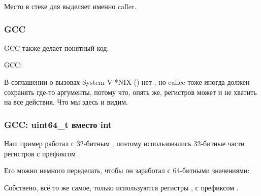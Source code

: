 Место в стеке для  выделяет именно \gls{caller}.

\subsubsection{GCC}

\Optimizing GCC также делает понятный код:



\NonOptimizing GCC:



В соглашении о вызовах System V *NIX (\SysVABI) нет , но \gls{callee} тоже иногда
должен сохранять где-то аргументы, потому что, опять же, регистров может и не хватить на все действия.
Что мы здесь и видим.

\subsubsection{GCC: uint64\_t вместо int}

Наш пример работал с 32-битным \Tint, поэтому использовались 32-битные части регистров с префиксом .

Его можно немного переделать, чтобы он заработал с 64-битными значениями:





Собствено, всё то же самое, только используются регистры , с префиксом .

